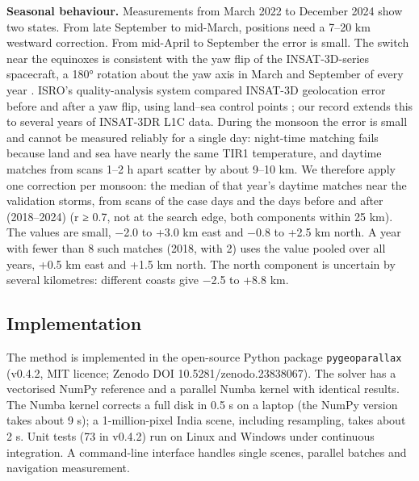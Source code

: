 \textbf{Seasonal behaviour.} Measurements from March 2022 to December 2024 show two states. From late September to mid-March, positions need a 7--20 km westward correction. From mid-April to September the error is small. The switch near the equinoxes is consistent with the yaw flip of the INSAT-3D-series spacecraft, a 180° rotation about the yaw axis in March and September of every year \citep{prakash2014}. ISRO's quality-analysis system compared INSAT-3D geolocation error before and after a yaw flip, using land--sea control points \citep{jindal2014}; our record extends this to several years of INSAT-3DR L1C data. During the monsoon the error is small and cannot be measured reliably for a single day: night-time matching fails because land and sea have nearly the same TIR1 temperature, and daytime matches from scans 1--2 h apart scatter by about 9--10 km. We therefore apply one correction per monsoon: the median of that year's daytime matches near the validation storms, from scans of the case days and the days before and after (2018--2024) (r ≥ 0.7, not at the search edge, both components within 25 km). The values are small, −2.0 to +3.0 km east and −0.8 to +2.5 km north. A year with fewer than 8 such matches (2018, with 2) uses the value pooled over all years, +0.5 km east and +1.5 km north. The north component is uncertain by several kilometres: different coasts give −2.5 to +8.8 km.

\subsection{Implementation}\label{sec:3.7}

The method is implemented in the open-source Python package \texttt{pygeoparallax} (v0.4.2, MIT licence; Zenodo DOI 10.5281/zenodo.23838067). The solver has a vectorised NumPy reference and a parallel Numba kernel \citep{lam2015} with identical results. The Numba kernel corrects a full disk in 0.5 s on a laptop (the NumPy version takes about 9 s); a 1-million-pixel India scene, including resampling, takes about 2 s. Unit tests (73 in v0.4.2) run on Linux and Windows under continuous integration. A command-line interface handles single scenes, parallel batches and navigation measurement.


